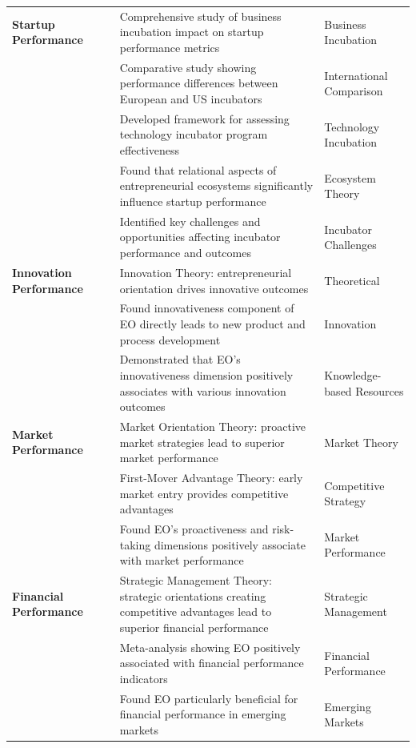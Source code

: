 \documentclass[../Main.tex]{subfiles}
\begin{document}
\begin{longtable}{|p{2.5cm}|p{3cm}|p{6cm}|p{2.5cm}|}
        \textbf{Startup Performance} & \cite{patton2014realising} & Comprehensive study of business incubation impact on startup performance metrics & Business Incubation \\
        & \cite{barbero2012revisiting} & Comparative study showing performance differences between European and US incubators & International Comparison \\
        & \cite{chan2005assessing} & Developed framework for assessing technology incubator program effectiveness & Technology Incubation \\
        & \cite{spigel2017relational} & Found that relational aspects of entrepreneurial ecosystems significantly influence startup performance & Ecosystem Theory \\
        & \cite{al2017challenges} & Identified key challenges and opportunities affecting incubator performance and outcomes & Incubator Challenges \\
        \hline
        
        \textbf{Innovation Performance} & \cite{schumpeter1934theory} & Innovation Theory: entrepreneurial orientation drives innovative outcomes & Theoretical \\
        & \cite{lumpkin1996clarifying} & Found innovativeness component of EO directly leads to new product and process development & Innovation \\
        & \cite{wiklund2003knowledge} & Demonstrated that EO's innovativeness dimension positively associates with various innovation outcomes & Knowledge-based Resources \\
        \hline
        
        \textbf{Market Performance} & \cite{narver1990effect} & Market Orientation Theory: proactive market strategies lead to superior market performance & Market Theory \\
        & \cite{lieberman1988first} & First-Mover Advantage Theory: early market entry provides competitive advantages & Competitive Strategy \\
        & \cite{lumpkin2001linking} & Found EO's proactiveness and risk-taking dimensions positively associate with market performance & Market Performance \\
        \hline
        
        \textbf{Financial Performance} & \cite{porter1980competitive} & Strategic Management Theory: strategic orientations creating competitive advantages lead to superior financial performance & Strategic Management \\
        & \cite{rauch2009entrepreneurial} & Meta-analysis showing EO positively associated with financial performance indicators & Financial Performance \\
        & \cite{saeed2014entrepreneurial} & Found EO particularly beneficial for financial performance in emerging markets & Emerging Markets \\
        \hline
    \end{longtable}
\end{document}
